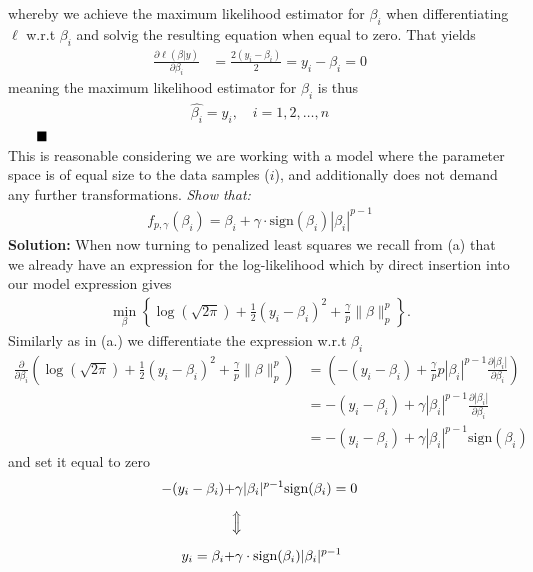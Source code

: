 whereby we achieve the maximum likelihood estimator for $\beta_i$ when differentiating $\ell$ w.r.t $\beta_i$ and solvig the resulting equation when equal to zero. That yields 
\begin{align}
    \frac{\partial \ell(\beta | y)}{\partial \beta_i} &=  \frac{2(y_i - \beta_i)}{2} = y_i - \beta_i = 0
\end{align}
meaning the maximum likelihood estimator for $\beta_i$ is thus 
\begin{align}
    \hat{\beta_i} = y_i, \quad i= 1,2, \ldots, n 
\end{align}
$\Q$ \vspace{3mm}\\ 
This is reasonable considering we are working with a model where the parameter space is of equal size to the data samples ($i$), and additionally does not demand any further transformations.
\emph{Show that:}
\begin{align}
    f_{p, \gamma}(\beta_i) = \beta_i + \gamma \cdot \text{sign}(\beta_i)|\beta_i|^{p-1}
\end{align}
\textbf{Solution:} \spaze 
When now turning to penalized least squares we recall from (a) that we already have an expression for the log-likelihood which by direct insertion into our model expression gives
\begin{align}
    \min_{\beta} \left\{\log(\sqrt{2\pi}) + \frac{1}{2} (y_i - \beta_i)^2 + \frac{\gamma}{p} \lVert \beta \rVert_{p}^{p} \right\}.
\end{align}
Similarly as in (a.) we differentiate the expression w.r.t $\beta_i$ 
\begin{align*}
\frac{\partial}{\partial \beta_i} \left(\log(\sqrt{2\pi}) + \frac{1}{2} (y_i - \beta_i)^2 + \frac{\gamma}{p} \lVert \beta \rVert_{p}^{p} \right) &=  \left( -(y_i - \beta_i) + \frac{\gamma}{p} p |\beta_i|^{p-1} \frac{\partial |\beta_i|}{\partial \beta_i} \right) \\[5pt] 
&=  -(y_i - \beta_i) + \gamma |\beta_i|^{p-1} \frac{\partial |\beta_i|}{\partial \beta_i} \\[5pt]
&= -(y_i - \beta_i) + \gamma |\beta_i|^{p-1} \text{sign}(\beta_i)
\end{align*}
and set it equal to zero 
\begin{align}
    -(y_i - \beta_i) + &\gamma |\beta_i|^{p-1} \text{sign}(\beta_i) = 0 \\[5pt]
     &\rotatebox[origin=c]{90}{%
  $\Longleftrightarrow$} \\[5pt]
     y_i = \beta_i + &\gamma \cdot \text{sign}(\beta_i)|\beta_i|^{p-1}
\end{align}
